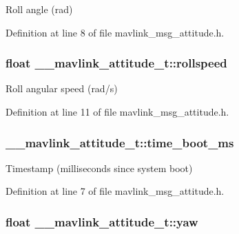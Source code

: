 Roll angle (rad) 



Definition at line 8 of file mavlink\-\_\-msg\-\_\-attitude.\-h.

\hypertarget{struct____mavlink__attitude__t_ae46e19a3dc0bde80d9a0eddbc0f9315d}{
\subsubsection[{rollspeed}]{\setlength{\rightskip}{0pt plus 5cm}float \-\_\-\-\_\-mavlink\-\_\-attitude\-\_\-t\-::rollspeed}}\label{struct____mavlink__attitude__t_ae46e19a3dc0bde80d9a0eddbc0f9315d}


Roll angular speed (rad/s) 



Definition at line 11 of file mavlink\-\_\-msg\-\_\-attitude.\-h.

\hypertarget{struct____mavlink__attitude__t_a7330cabdd19ca8d3dc27ff1a6b585326}{
\subsubsection[{time\-\_\-boot\-\_\-ms}]{ \-\_\-\-\_\-mavlink\-\_\-attitude\-\_\-t\-::time\-\_\-boot\-\_\-ms}}\label{struct____mavlink__attitude__t_a7330cabdd19ca8d3dc27ff1a6b585326}


Timestamp (milliseconds since system boot) 



Definition at line 7 of file mavlink\-\_\-msg\-\_\-attitude.\-h.

\hypertarget{struct____mavlink__attitude__t_a24ce486ebd7bde1558ad456684bcbd93}{
\subsubsection[{yaw}]{\setlength{\rightskip}{0pt plus 5cm}float \-\_\-\-\_\-mavlink\-\_\-attitude\-\_\-t\-::yaw}}\label{struct____mavlink__attitude__t_a24ce486ebd7bde1558ad456684bcbd93}


